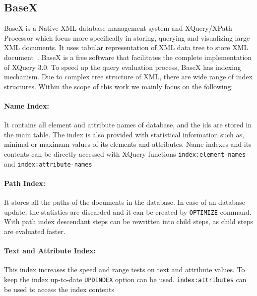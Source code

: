 	\subsection{BaseX}
	BaseX is a Native XML database management system and XQuery/XPath Processor which focus  more specifically in storing, querying and visualizing large XML documents. It uses tabular representation of XML data tree to store XML document~\citep{www/basex}. BaseX is a free software that facilitates the complete implementation of XQuery 3.0. To speed up the query evaluation process, BaseX has indexing mechanism. Due to complex tree structure of XML, there are wide range of index structures. Within the scope of this work we mainly focus on the following:
	\paragraph{Name Index:} It contains all element and attribute names of database, and the ids are stored in the main table. The index is also provided with statistical information such as, minimal or maximum values of its elements and attributes. Name indexes and its contents can be directly accessed with XQuery functions \texttt{index:element-names} and \texttt{index:attribute-names}
	 \paragraph{Path Index:} It stores all the paths of the documents in the database. In case of an database update, the statistics are discarded and it can be created by \texttt{OPTIMIZE} command. With path index descendant steps can be rewritten into child steps, as child steps are evaluated faster.
	 \paragraph{Text and Attribute Index:} This index increases the speed and range tests on text and attribute values. To keep the index up-to-date \texttt{UPDINDEX} option can be used. \texttt{index:attributes} can be used to access the index contents
